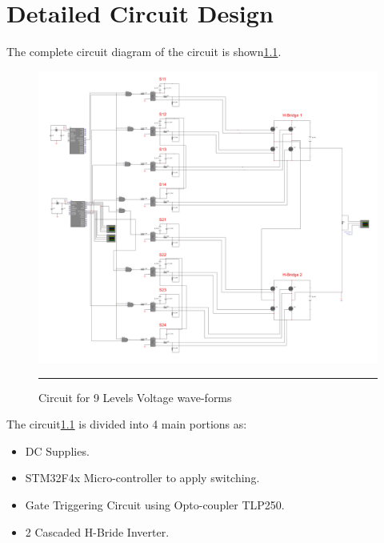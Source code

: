 
\chapter{Detailed Circuit Design} %
\label{Chapter4}
The complete circuit diagram of the circuit is shown\ref{fig:1}. 
\begin{figure}[htbp]
	
		\includegraphics[width = 6in]{./Figures/Photos/circuit.pdf}
		\rule{35em}{2pt}
	\caption{Circuit for 9 Levels Voltage wave-forms}
	\label{fig:1}
\end{figure}
\newpage
The circuit\ref{fig:1} is divided into 4 main portions as:
\begin{itemize}
\item DC Supplies.
\item STM32F4x Micro-controller to apply switching.
\item Gate Triggering Circuit using Opto-coupler TLP250.
\item 2 Cascaded H-Bride Inverter.
\end{itemize}
